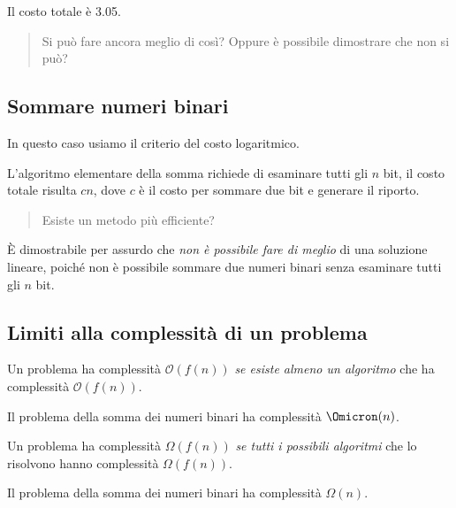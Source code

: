 Il costo totale è \num{3.05}.

\begin{quote}
Si può fare ancora meglio di così?
Oppure è possibile dimostrare che non si può?
\end{quote}

\clearpage
\subsection{Sommare numeri binari}

\begin{note}
In questo caso usiamo il criterio del costo logaritmico.
\end{note}

L'algoritmo elementare della somma richiede di esaminare tutti gli \(n\) bit, il costo totale risulta \(cn\), dove \(c\) è il costo per sommare due bit e generare il riporto.

\begin{quote}
Esiste un metodo più efficiente?
\end{quote}

\`{E} dimostrabile per assurdo che \emph{non è possibile fare di meglio} di una soluzione lineare, poiché non è possibile sommare due numeri binari senza esaminare tutti gli \(n\) bit.

\subsection*{Limiti alla complessità di un problema}

\begin{definition*}
Un problema ha complessità \(\mathcal{O}(f(n))\) \emph{se esiste almeno un algoritmo} che ha complessità \(\mathcal{O}(f(n))\).
\end{definition*}

\begin{note}
Il problema della somma dei numeri binari ha complessità \(\Omicron(n)\).
\end{note}

\begin{definition*}
Un problema ha complessità \(\Omega(f(n))\) \emph{se tutti i possibili algoritmi} che lo risolvono hanno complessità \(\Omega(f(n))\).
\end{definition*}

\begin{note}
Il problema della somma dei numeri binari ha complessità \(\Omega(n)\).
\end{note}

